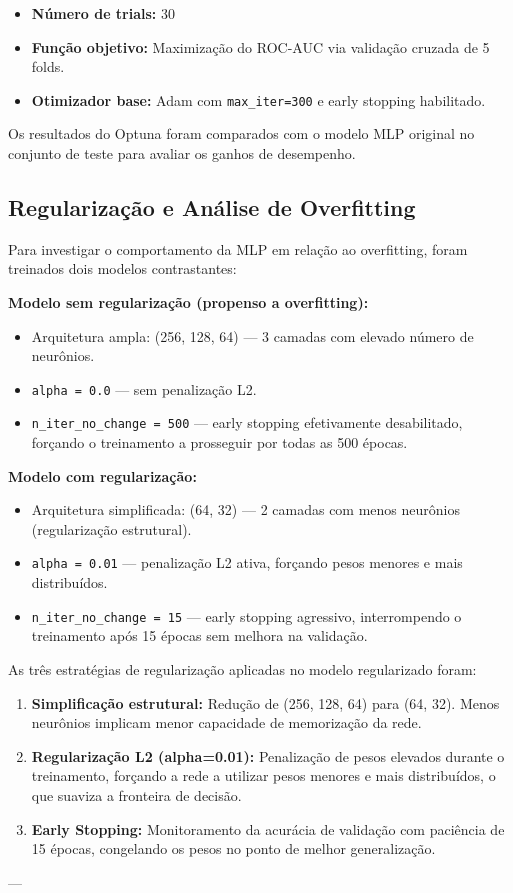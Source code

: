 \documentclass[12pt]{article}
\begin{document}
\begin{itemize}
\item \textbf{Número de trials:} 30
\item \textbf{Função objetivo:} Maximização do ROC-AUC via validação cruzada de 5 folds.
\item \textbf{Otimizador base:} Adam com \texttt{max\_iter=300} e early stopping habilitado.

\end{itemize}
Os resultados do Optuna foram comparados com o modelo MLP original no conjunto de teste para avaliar os ganhos de desempenho.

\subsection{Regularização e Análise de Overfitting}

Para investigar o comportamento da MLP em relação ao overfitting, foram treinados dois modelos contrastantes:

\textbf{Modelo sem regularização (propenso a overfitting):}
\begin{itemize}
\item Arquitetura ampla: (256, 128, 64) --- 3 camadas com elevado número de neurônios.
\item \texttt{alpha = 0.0} --- sem penalização L2.
\item \texttt{n\_iter\_no\_change = 500} --- early stopping efetivamente desabilitado, forçando o treinamento a prosseguir por todas as 500 épocas.

\end{itemize}
\textbf{Modelo com regularização:}
\begin{itemize}
\item Arquitetura simplificada: (64, 32) --- 2 camadas com menos neurônios (regularização estrutural).
\item \texttt{alpha = 0.01} --- penalização L2 ativa, forçando pesos menores e mais distribuídos.
\item \texttt{n\_iter\_no\_change = 15} --- early stopping agressivo, interrompendo o treinamento após 15 épocas sem melhora na validação.

\end{itemize}
As três estratégias de regularização aplicadas no modelo regularizado foram:

\begin{enumerate}
\item \textbf{Simplificação estrutural:} Redução de (256, 128, 64) para (64, 32). Menos neurônios implicam menor capacidade de memorização da rede.
\item \textbf{Regularização L2 (alpha=0.01):} Penalização de pesos elevados durante o treinamento, forçando a rede a utilizar pesos menores e mais distribuídos, o que suaviza a fronteira de decisão.
\item \textbf{Early Stopping:} Monitoramento da acurácia de validação com paciência de 15 épocas, congelando os pesos no ponto de melhor generalização.

\end{enumerate}
---
\end{document}
